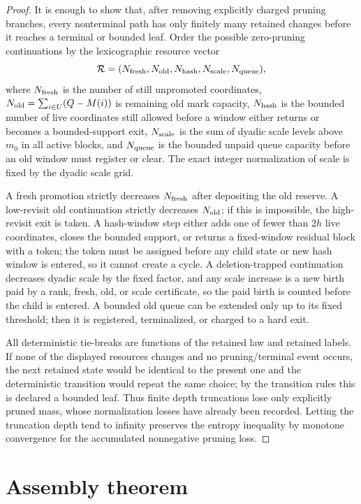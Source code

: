 \documentclass[11pt]{article}
\theoremstyle{remark}
\begin{document}
\begin{proof}
It is enough to show that, after removing explicitly charged pruning branches, every nonterminal path has only finitely many retained changes before it reaches a terminal or bounded leaf.  Order the possible zero-pruning continuations by the lexicographic resource vector
\[
        \mathcal R=(N_{\rm fresh},N_{\rm old},N_{\rm hash},N_{\rm scale},N_{\rm queue}),
\]
where $N_{\rm fresh}$ is the number of still unpromoted coordinates, $N_{\rm old}=\sum_{i\in U}(Q-M(i))$ is remaining old mark capacity, $N_{\rm hash}$ is the bounded number of live coordinates still allowed before a window either returns or becomes a bounded-support exit, $N_{\rm scale}$ is the sum of dyadic scale levels above $m_0$ in all active blocks, and $N_{\rm queue}$ is the bounded unpaid queue capacity before an old window must register or clear.  The exact integer normalization of scale is fixed by the dyadic scale grid.

A fresh promotion strictly decreases $N_{\rm fresh}$ after depositing the old reserve.  A low-revisit old continuation strictly decreases $N_{\rm old}$; if this is impossible, the high-revisit exit is taken.  A hash-window step either adds one of fewer than $2h$ live coordinates, closes the bounded support, or returns a fixed-window residual block with a token; the token must be assigned before any child state or new hash window is entered, so it cannot create a cycle.  A deletion-trapped continuation decreases dyadic scale by the fixed factor, and any scale increase is a new birth paid by a rank, fresh, old, or scale certificate, so the paid birth is counted before the child is entered.  A bounded old queue can be extended only up to its fixed threshold; then it is registered, terminalized, or charged to a hard exit.

All deterministic tie-breaks are functions of the retained law and retained labels.  If none of the displayed resources changes and no pruning/terminal event occurs, the next retained state would be identical to the present one and the deterministic transition would repeat the same choice; by the transition rules this is declared a bounded leaf.  Thus finite depth truncations lose only explicitly pruned mass, whose normalization losses have already been recorded.  Letting the truncation depth tend to infinity preserves the entropy inequality by monotone convergence for the accumulated nonnegative pruning loss.
\end{proof}

\section{Assembly theorem}
\end{document}
